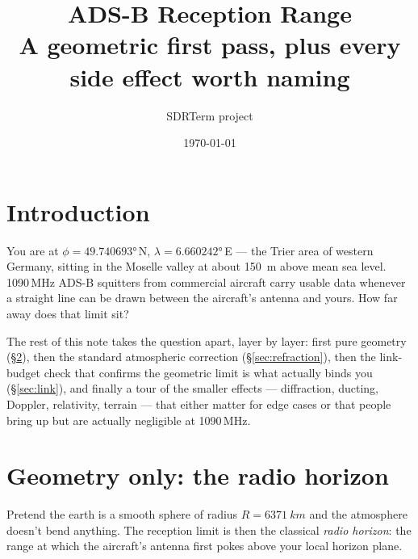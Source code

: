 \documentclass[11pt,a4paper]{article}
\title{ADS-B Reception Range\\
       \large A geometric first pass, plus every side effect worth naming}
\author{SDRTerm project}
\date{\today}
\begin{document}
\maketitle
\tableofcontents
\vspace{1em}

\section{Introduction}

You are at $\phi = \ang{49.740693}$\,N, $\lambda = \ang{6.660242}$\,E ---
the Trier area of western Germany, sitting in the Moselle valley at
about \SI{150}{m} above mean sea level.  1090\,MHz ADS-B squitters
from commercial aircraft carry usable data whenever a straight line
can be drawn between the aircraft's antenna and yours.  How far away
does that limit sit?

The rest of this note takes the question apart, layer by layer:
first pure geometry (\S\ref{sec:geom}), then the standard atmospheric
correction (\S\ref{sec:refraction}), then the link-budget check that
confirms the geometric limit is what actually binds you (\S\ref{sec:link}),
and finally a tour of the smaller effects --- diffraction, ducting,
Doppler, relativity, terrain --- that either matter for edge cases
or that people bring up but are actually negligible at 1090\,MHz.

\section{Geometry only: the radio horizon}\label{sec:geom}

Pretend the earth is a smooth sphere of radius $R = \SI{6371}{km}$ and
the atmosphere doesn't bend anything.  The reception limit is then the
classical \emph{radio horizon}: the range at which the aircraft's antenna
first pokes above your local horizon plane.
\end{document}
